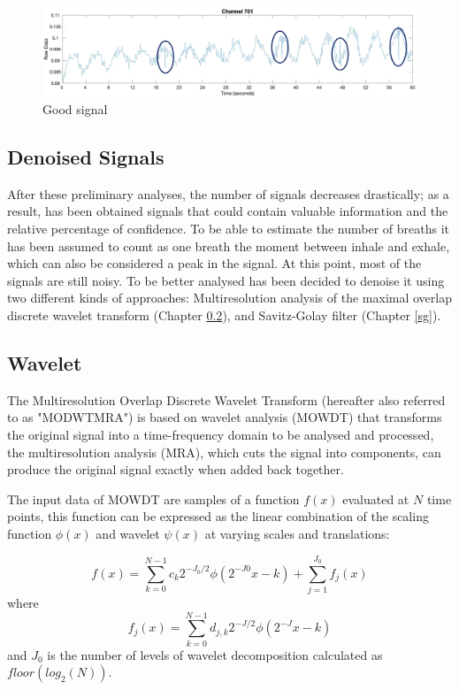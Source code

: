 \begin{figure}[H]
    \centering
    \includegraphics[width=\textwidth]{img/goodSpikes.png}
    \caption{Good signal}
    \label{fig:goodSignal}
\end{figure}

\subsection{Denoised Signals}
After these preliminary analyses, the number of signals decreases drastically; as a result, has been obtained signals that could contain valuable information and the relative percentage of confidence.
To be able to estimate the number of breaths it has been assumed to count as one breath the moment between inhale and exhale, which can also be considered a peak in the signal.
At this point, most of the signals are still noisy. To be better analysed has been decided to denoise it using two different kinds of approaches: Multiresolution analysis of the maximal overlap discrete wavelet transform (Chapter \ref{Wavelet}), and Savitz-Golay filter (Chapter \ref{sg}).

\subsection{Wavelet} \label{Wavelet}

The Multiresolution Overlap Discrete Wavelet Transform (hereafter also referred to as "MODWTMRA") is based on wavelet analysis (MOWDT) that transforms the original signal into a time-frequency domain to be analysed and processed, the multiresolution analysis (MRA), which cuts the signal into components, can produce the original signal exactly when added back together.

The input data of MOWDT are samples of a function $f(x)$ evaluated at $N$ time points, this function can be expressed as the linear combination of the scaling function $\phi(x)$ and wavelet $\psi(x)$ at varying scales and translations:

$$f(x)=\sum_{k=0}^{N-1} c_k 2^{-J_0/2} \phi(2^{-J0}x-k) + \sum_{j=1}^{J_0}f_j(x)$$
where $$f_j(x)=\sum_{k=0}^{N-1} d_{j,k}2^{-J/2} \phi(2^{-J}x-k)$$
and $J_0$ is the number of levels of wavelet decomposition calculated as $floor(log_2(N))$.

